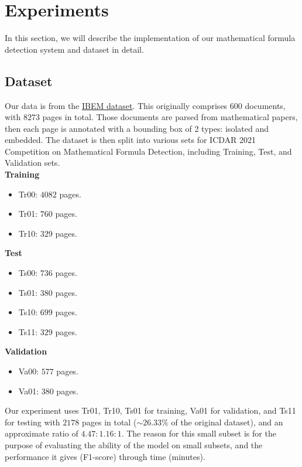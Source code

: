 \section{Experiments}
In this section, we will describe the implementation of our mathematical formula detection system and dataset in detail.
\subsection{Dataset}
Our data is from the \href{https://zenodo.org/record/4757865}{IBEM dataset}. This originally comprises $600$ documents, with $8273$ pages in total. Those documents are parsed from mathematical papers, then each page is annotated with a bounding box of 2 types: isolated and embedded. The dataset is then split into various sets for ICDAR 2021 Competition on Mathematical Formula Detection, including Training, Test, and Validation sets. \\
\textbf{Training}
\begin{itemize}
\item Tr00: $4082$ pages.
\item Tr01: $760$ pages.
\item Tr10: $329$ pages.
\end{itemize}
\textbf{Test}
\begin{itemize}
\item Ts00: $736$ pages.
\item Ts01: $380$ pages.
\item Ts10: $699$ pages.
\item Ts11: $329$ pages.
\end{itemize}
\textbf{Validation}
\begin{itemize}
\item Va00: $577$ pages.
\item Va01: $380$ pages.
\end{itemize}
Our experiment uses Tr01, Tr10, Ts01 for training, Va01 for validation, and Ts11 for testing with $2178$ pages in total ($ \sim 26.33\% $ of the original dataset), and an approximate ratio of $4.47:1.16:1.$ The reason for this small subset is for the purpose of evaluating the ability of the model on small subsets, and the performance it gives (F1-score) through time (minutes).
